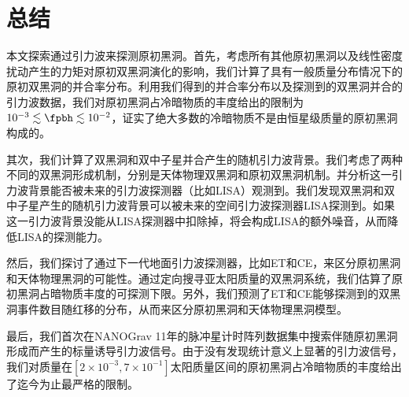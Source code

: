 \chapter{总结}

本文探索通过引力波来探测原初黑洞。首先，考虑所有其他原初黑洞以及线性密度扰动产生的力矩对原初双黑洞演化的影响，我们计算了具有一般质量分布情况下的原初双黑洞的并合率分布。利用我们得到的并合率分布以及\lvc 探测到的双黑洞并合的引力波数据，我们对原初黑洞占冷暗物质的丰度给出的限制为$10^{-3} \lesssim \fpbh \lesssim 10^{-2}$，证实了绝大多数的冷暗物质不是由恒星级质量的原初黑洞构成的。

其次，我们计算了双黑洞和双中子星并合产生的随机引力波背景。我们考虑了两种不同的双黑洞形成机制，分别是天体物理双黑洞和原初双黑洞机制。并分析这一引力波背景能否被未来的引力波探测器（比如LISA）观测到。我们发现双黑洞和双中子星产生的随机引力波背景可以被未来的空间引力波探测器LISA探测到。如果这一引力波背景没能从LISA探测器中扣除掉，将会构成LISA的额外噪音，从而降低LISA的探测能力。

然后，我们探讨了通过下一代地面引力波探测器，比如ET和CE，来区分原初黑洞和天体物理黑洞的可能性。通过定向搜寻亚太阳质量的双黑洞系统，我们估算了原初黑洞占暗物质丰度的可探测下限。另外，我们预测了ET和CE能够探测到的双黑洞事件数目随红移的分布，从而来区分原初黑洞和天体物理黑洞模型。

最后，我们首次在NANOGrav 11年的脉冲星计时阵列数据集中搜索伴随原初黑洞形成而产生的标量诱导引力波信号。由于没有发现统计意义上显著的引力波信号，我们对质量在$[2 \times 10^{-3}, 7\times 10^{-1}]$太阳质量区间的原初黑洞占冷暗物质的丰度给出了迄今为止最严格的限制。

